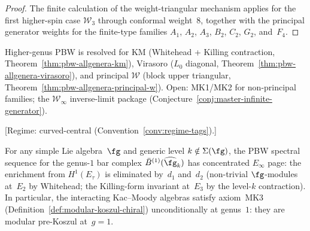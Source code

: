 \begin{proof}
The finite calculation of the weight-triangular mechanism applies for the first
higher-spin case $\mathcal{W}_3$ through conformal weight~$8$,
together with the principal generator weights for the finite-type
families $A_1$, $A_2$, $A_3$, $B_2$, $C_2$, $G_2$, and~$F_4$.
\end{proof}

\begin{remark}\label{rem:mk4-status}
Higher-genus PBW is resolved for KM (Whitehead + Killing contraction,
Theorem~\ref{thm:pbw-allgenera-km}), Virasoro ($L_0$ diagonal,
Theorem~\ref{thm:pbw-allgenera-virasoro}), and principal
$\mathcal{W}$ (block upper triangular,
Theorem~\ref{thm:pbw-allgenera-principal-w}).
Open: MK1/MK2 for non-principal families; the $\mathcal{W}_\infty$
inverse-limit package
(Conjecture~\ref{conj:master-infinite-generator}).
\end{remark}

\begin{theorem}
\label{thm:pbw-genus1-km}
\textup{[Regime: curved-central
\textup{(}Convention~\textup{\ref{conv:regime-tags})}.]}

For any simple Lie algebra~$\fg$ and generic level
$k \notin \Sigma(\fg)$, the PBW spectral sequence for the
genus-$1$ bar complex
$\bar{B}^{(1)}(\widehat{\fg}_k)$ has concentrated
$E_\infty$ page: the enrichment from $H^1(E_\tau)$
is eliminated by~$d_1$ and~$d_2$
\textup{(}non-trivial $\fg$-modules at~$E_2$
by Whitehead; the Killing-form invariant
at~$E_3$ by the level-$k$ contraction\textup{)}.
In particular, the interacting Kac--Moody algebras satisfy
axiom~\textup{MK3}
\textup{(}Definition~\textup{\ref{def:modular-koszul-chiral})}
unconditionally at genus~$1$:
they are modular pre-Koszul at~$g = 1$.
\end{theorem}

